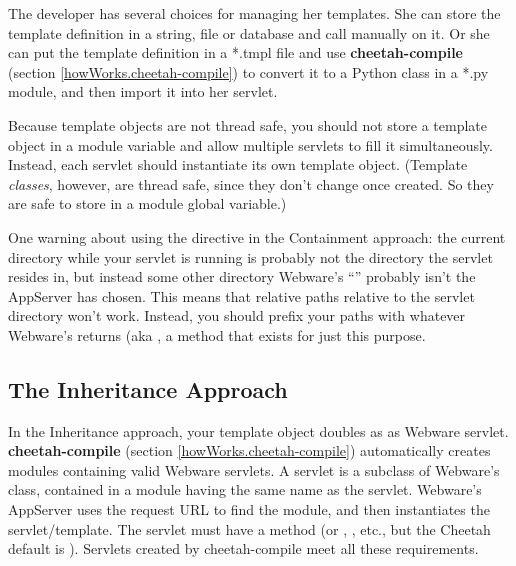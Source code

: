 The developer has several choices for managing her templates.  She can store the
template definition in a string, file or database and call
 manually on it.  Or she can put the
template definition in a *.tmpl file and use {\bf cheetah-compile} (section
\ref{howWorks.cheetah-compile}) to convert it to a Python class in a *.py
module, and then import it into her servlet.

Because template objects are not thread safe, you should not store a
template object in a module variable and allow multiple servlets to fill it
simultaneously.  Instead, each servlet should instantiate its own template
object.  (Template {\em classes}, however, are thread safe, since they don't
change once created.  So they are safe to store in a module global variable.)

One warning about using the  directive in the Containment
approach: the current directory while your servlet is running is probably not
the directory the servlet resides in, but instead some other directory
Webware's ``'' probably isn't the AppServer has
chosen.  This means that relative paths relative to the servlet directory
won't work.  Instead, you should prefix your paths with whatever Webware's
 returns (aka , a
method that exists for just this purpose.



\subsection{The Inheritance Approach}
\label{webware.inheritance}

In the Inheritance approach, your template object doubles as as Webware 
servlet.  {\bf cheetah-compile} (section \ref{howWorks.cheetah-compile}) 
automatically creates modules containing valid Webware servlets.  A servlet is
a subclass of Webware's  class, contained in a module
having the same name as the servlet.  Webware's AppServer uses the request URL
to find the module, and then instantiates the servlet/template.  The servlet
must have a  method (or ,
, etc., but the Cheetah default is ).
Servlets created by cheetah-compile meet all these requirements.

